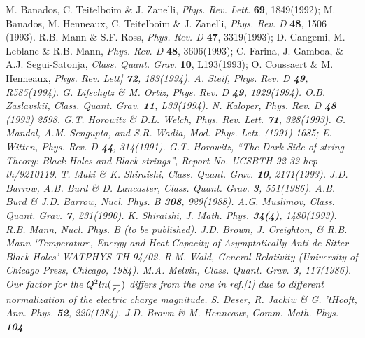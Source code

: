 \documentclass[12pt]{article}
\begin{document}
\begin{thebibliography}{25}

    M. Banados, C. Teitelboim \& J. Zanelli,
          {\sl Phys. Rev. Lett.} {\bf 69}, 1849(1992);
          M. Banados, M. Henneaux, C. Teitelboim \& J. Zanelli,
          {\sl Phys. Rev. D} {\bf 48}, 1506 (1993).
    R.B. Mann \& S.F. Ross, {\sl Phys. Rev. D} {\bf 47}, 3319(1993);
      D. Cangemi, M. Leblanc \& R.B. Mann,
      {\sl Phys. Rev. D} {\bf 48}, 3606(1993);
      C. Farina, J. Gamboa, \& A.J. Segui-Satonja,
           {\sl Class. Quant. Grav.} {\bf 10}, L193(1993);
      O. Coussaert \& M. Henneaux, {\sl Phys. Rev. Lett] {\bf 72}, 183(1994).
     A. Steif, {\sl Phys. Rev. D} {\bf 49}, R585(1994).
     G. Lifschytz \& M. Ortiz, {\sl Phys. Rev. D} {\bf 49}, 1929(1994).
     O.B. Zaslavskii, {\sl Class. Quant. Grav.} {\bf 11}, L33(1994).
     N. Kaloper, {\sl Phys. Rev. D} {\bf 48} (1993) 2598.
    G.T. Horowitz \& D.L. Welch, {\sl Phys. Rev. Lett.}
          {\bf 71}, 328(1993).
     G. Mandal, A.M. Sengupta, and S.R. Wadia, Mod. Phys. Lett.
         (1991) 1685; E. Witten, {\sl Phys. Rev. D} {\bf 44}, 314(1991).
    G.T. Horowitz, ``The Dark Side of string Theory: Black Holes and
           Black strings'', Report No. UCSBTH-92-32-hep-th/9210119.
    T. Maki \& K. Shiraishi, {\sl Class. Quant. Grav.}
          {\bf 10}, 2171(1993).
    J.D. Barrow, A.B. Burd \& D. Lancaster, {\sl Class. Quant.
    Grav.}
          {\bf 3}, 551(1986).
    A.B. Burd \& J.D. Barrow, {\sl Nucl. Phys. B} {\bf 308},
          929(1988).
    A.G. Muslimov, {\sl Class. Quant. Grav.} {\bf 7}, 231(1990).
    K. Shiraishi, {\sl J. Math. Phys.} {\bf 34(4)}, 1480(1993).
    R.B. Mann, {\sl Nucl. Phys. B} (to be published).
    J.D. Brown, J. Creighton, \& R.B. Mann  `Temperature, Energy
    and Heat Capacity of Asymptotically Anti-de-Sitter Black Holes'
    WATPHYS TH-94/02.
    R.M. Wald, {\sl General Relativity} (University of Chicago
    Press,
           Chicago, 1984).
    M.A. Melvin, {\sl Class. Quant. Grav.} {\bf 3}, 117(1986).
    Our factor for the $Q^2ln({\over r_o})$ differs from
           the one in ref.[1] due to different normalization of the
           electric charge magnitude.
    S. Deser, R. Jackiw \& G. 'tHooft, {\sl Ann. Phys.}
           {\bf 52}, 220(1984).
    J.D. Brown \& M. Henneaux, {\sl Comm. Math. Phys.} {\bf 104}
}
\end{thebibliography}
\end{document}
